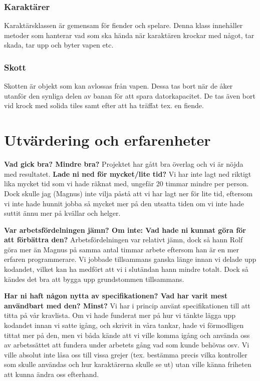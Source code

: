 \documentclass{scrartcl}
\begin{document}
\subsubsection{Karaktärer}

Karaktärsklassen är gemensam för fiender och spelare. Denna klass innehåller metoder som hanterar vad som ska hända när karaktären krockar med något, tar skada, tar upp och byter vapen etc.  

\subsubsection{Skott}

Skotten är objekt som kan avlossas från vapen. Dessa tas bort när de åker utanför den synliga delen av banan för att spara datorkapacitet. De tas även bort vid krock med solida tiles samt efter att ha träffat tex. en fiende. 

\section{Utvärdering och erfarenheter}


\textbf{Vad gick bra? Mindre bra?}
Projektet har gått bra överlag och vi är nöjda med resultatet.  
\textbf{Lade ni ned för mycket/lite tid?}
Vi har inte lagt ned riktigt lika mycket tid som vi hade räknat med, ungefär 20 timmar mindre per person. Dock skulle jag (Magnus) inte vilja påstå att vi har lagt ner för lite tid, eftersom vi inte hade hunnit jobba så mycket mer på den utsatta tiden om vi inte hade suttit ännu mer på kvällar och helger.

\textbf{Var arbetsfördelningen jämn? Om inte: Vad hade ni kunnat göra för att förbättra den?}
Arbetsfördelningen var relativt jämn, dock så hann Rolf göra mer än Magnus på samma antal timmar arbete eftersom han är en mer erfaren programmerare. Vi jobbade tillsammans ganska länge innan vi delade upp kodandet, vilket kan ha medfört att vi i slutändan hann mindre totalt. Dock så kändes det bra att bygga upp grundstommen tillsammans. 

\textbf{Har ni haft någon nytta av specifikationen? Vad har varit mest användbart med den? Minst?}
Vi har i princip använt specifikationen till att titta på vår kravlista. Om vi hade funderat mer på hur vi tänkte lägga upp kodandet innan vi satte igång, och skrivit in våra tankar, hade vi förmodligen tittat mer på den, men vi båda kände att vi ville komma igång och använda oss av arbetssättet att fundera under arbetets gång vad som kunde behövas osv. Vi ville absolut inte låsa oss till vissa grejer (tex. bestämma precis vilka kontroller som skulle användas och hur karaktärerna skulle se ut) utan ville känna friheten att kunna ändra oss efterhand. 
\end{document}
